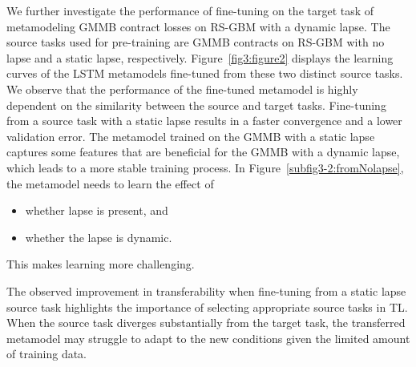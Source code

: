 We further investigate the performance of fine-tuning on the target task of metamodeling GMMB contract losses on RS-GBM with a dynamic lapse. 
The source tasks used for pre-training are GMMB contracts on RS-GBM with no lapse and a static lapse, respectively. 
Figure~\ref{fig3:figure2} displays the learning curves of the LSTM metamodels fine-tuned from these two distinct source tasks.
We observe that the performance of the fine-tuned metamodel is highly dependent on the similarity between the source and target tasks.
Fine-tuning from a source task with a static lapse results in a faster convergence and a lower validation error.
The metamodel trained on the GMMB with a static lapse captures some features that are beneficial for the GMMB with a dynamic lapse, which leads to a more stable training process.
In Figure~\ref{subfig3-2:fromNolapse}, the metamodel needs to learn the effect of 

\begin{itemize}
    \item whether lapse is present, and
    \item whether the lapse is dynamic.
\end{itemize}
This makes learning more challenging.

The observed improvement in transferability when fine-tuning from a static lapse source task highlights the importance of selecting appropriate source tasks in TL. 
When the source task diverges substantially from the target task, the transferred metamodel may struggle to adapt to the new conditions given the limited amount of training data.


